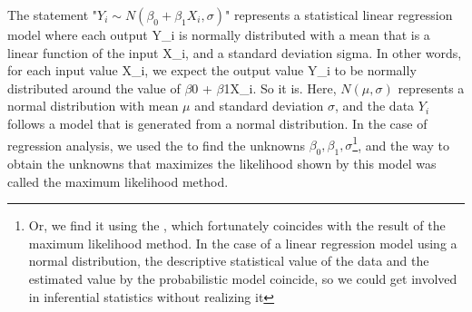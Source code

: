 \documentclass{ltjsbook}
\begin{document}
The statement "$ Y_i \sim N(\beta_0 + \beta_1 X_i, \sigma) $" represents a statistical linear regression model where each output Y_i is normally distributed with a mean that is a linear function of the input X_i, and a standard deviation sigma. In other words, for each input value X_i, we expect the output value Y_i to be normally distributed around the value of $\beta$0 + $\beta$1X_i.
So it is. Here, $N(\mu,\sigma)$ represents a normal distribution with mean $\mu$ and standard deviation $\sigma$, and the data $Y_i$ follows a model that is generated from a normal distribution. In the case of regression analysis, we used the  to find the unknowns $\beta_0,\beta_1,\sigma$\footnote{Or, we find it using the , which fortunately coincides with the result of the maximum likelihood method. In the case of a linear regression model using a normal distribution, the descriptive statistical value of the data and the estimated value by the probabilistic model coincide, so we could get involved in inferential statistics without realizing it}, and the way to obtain the unknowns that maximizes the likelihood shown by this model was called the maximum likelihood method.
\end{document}
